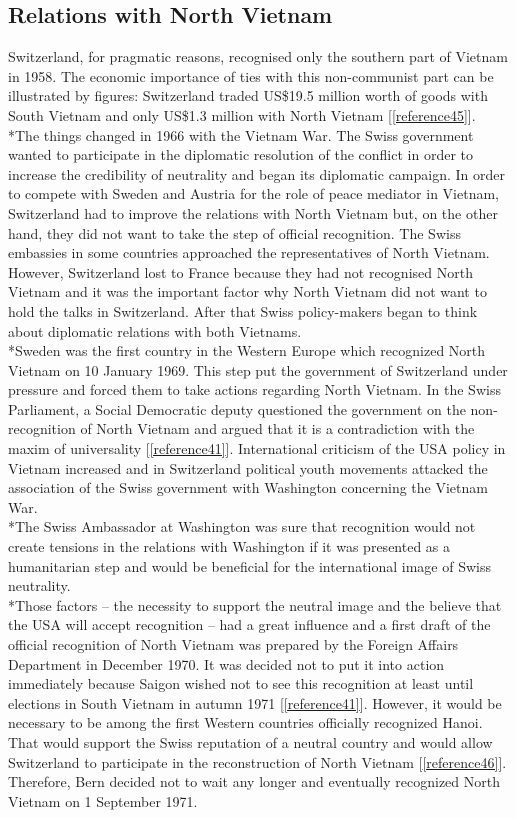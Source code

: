\documentclass[a4paper]{article}
\begin{document}
\subsection{Relations with North Vietnam}
Switzerland, for pragmatic reasons, recognised only the southern part of Vietnam in 1958. The economic importance of ties with this non-communist part can be illustrated by figures: Switzerland traded US\$19.5 million worth of goods with South Vietnam and only US\$1.3 million with North Vietnam [\ref{reference45}].
\\*The things changed in 1966 with the Vietnam War. The Swiss government wanted to participate in the diplomatic resolution of the conflict in order to increase the credibility of neutrality and began its diplomatic campaign. In order to compete with Sweden and Austria for the role of peace mediator in Vietnam, Switzerland had to improve the relations with North Vietnam but, on the other hand, they did not want to take the step of official recognition. The Swiss embassies in some countries approached the representatives of North Vietnam. However, Switzerland lost to France because they had not recognised North Vietnam and it was the important factor why North Vietnam did not want to hold the talks in Switzerland. After that Swiss policy-makers began to think about diplomatic relations with both Vietnams.
\\*Sweden was the first country in the Western Europe which recognized North Vietnam on 10 January 1969. This step put the government of Switzerland under pressure and forced them to take actions regarding North Vietnam. In the Swiss Parliament, a Social Democratic deputy questioned the government on the non-recognition of North Vietnam and argued that it is a contradiction with the maxim of universality [\ref{reference41}]. International criticism of the USA policy in Vietnam increased and in Switzerland political youth movements attacked the association of the Swiss government with Washington concerning the Vietnam War.
\\*The Swiss Ambassador at Washington was sure that recognition would not create tensions in the relations with Washington if it was presented as a humanitarian step and would be beneficial for the international image of Swiss neutrality.
\\*Those factors – the necessity to support the neutral image and the believe that the USA will accept recognition – had a great influence and a first draft of the official recognition of North Vietnam was prepared by the Foreign Affairs Department in December 1970. It was decided not to put it into action immediately because Saigon wished not to see this recognition at least until elections in South Vietnam in autumn 1971 [\ref{reference41}]. However, it would be necessary to be among the first Western countries officially recognized Hanoi. That would support the Swiss reputation of a neutral country and would allow Switzerland to participate in the reconstruction of North Vietnam [\ref{reference46}]. Therefore, Bern decided not to wait any longer and eventually recognized North Vietnam on 1 September 1971.
\end{document}
